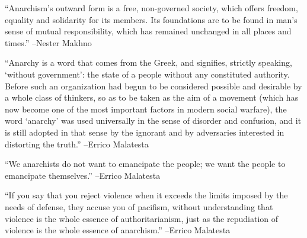 \documentclass{article}%
\begin{document}
\linebreak%
\vspace{1mm}%
\begin{minipage}{\textwidth}%
\flushleft%
“Anarchism's outward form is a free, non{-}governed society, which offers freedom, equality and solidarity for its members. Its foundations are to be found in man's sense of mutual responsibility, which has remained unchanged in all places and times.”%
\linebreak%
\vspace{1mm}%
–Nester Makhno%
\linebreak%
\vspace{1mm}%
\end{minipage}%
\linebreak%
\vspace{1mm}%
\begin{minipage}{\textwidth}%
\flushleft%
“Anarchy is a word that comes from the Greek, and signifies, strictly speaking, ‘without government’: the state of a people without any constituted authority. Before such an organization had begun to be considered possible and desirable by a whole class of thinkers, so as to be taken as the aim of a movement (which has now become one of the most important factors in modern social warfare), the word ‘anarchy’ was used universally in the sense of disorder and confusion, and it is still adopted in that sense by the ignorant and by adversaries interested in distorting the truth.”%
\linebreak%
\vspace{1mm}%
–Errico Malatesta%
\linebreak%
\vspace{1mm}%
\end{minipage}%
\linebreak%
\vspace{1mm}%
\begin{minipage}{\textwidth}%
\flushleft%
“We anarchists do not want to emancipate the people; we want the people to emancipate themselves.”%
\linebreak%
\vspace{1mm}%
–Errico Malatesta%
\linebreak%
\vspace{1mm}%
\end{minipage}%
\linebreak%
\vspace{1mm}%
\begin{minipage}{\textwidth}%
\flushleft%
“If you say that you reject violence when it exceeds the limits imposed by the needs of defense, they accuse you of pacifism, without understanding that violence is the whole essence of authoritarianism, just as the repudiation of violence is the whole essence of anarchism.”%
\linebreak%
\vspace{1mm}%
–Errico Malatesta%
\linebreak%
\vspace{1mm}%
\end{minipage}%
\end{document}
